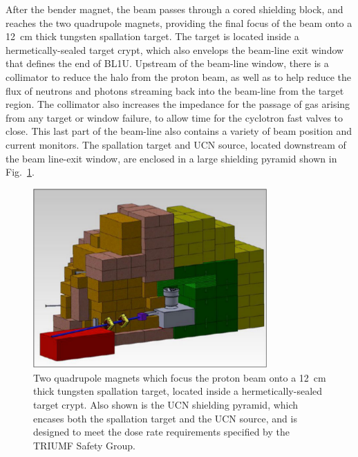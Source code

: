 After the bender magnet, the beam passes through a cored shielding
block, and reaches the two quadrupole magnets, providing the final
focus of the beam onto a 12~cm thick tungsten spallation target.  The
target is located inside a hermetically-sealed target crypt, which
also envelops the beam-line exit window that defines the end of BL1U.
Upstream of the beam-line window, there is a collimator to reduce the
halo from the proton beam, as well as to help reduce the flux of
neutrons and photons streaming back into the beam-line from the target
region. The collimator also increases the impedance for the passage of
gas arising from any target or window failure, to allow time for the
cyclotron fast valves to close. This last part of the beam-line also
contains a variety of beam position and current monitors. The
spallation target and UCN source, located downstream of the beam
line-exit window, are enclosed in a large shielding pyramid shown in
Fig.~\ref{fig:pyramid}.
\begin{figure}[h!]
  \centering
  \includegraphics[width=0.8\textwidth]{pyramid.png}
  \caption[Two quadrupole magnets and the shidling pyramid]{Two
    quadrupole magnets which focus the proton beam onto a 12~cm thick
    tungsten spallation target, located inside a hermetically-sealed
    target crypt. Also shown is the UCN shielding pyramid, which
    encases both the spallation target and the UCN source, and is
    designed to meet the dose rate requirements specified by the
    TRIUMF Safety Group.}
  \label{fig:pyramid}
\end{figure}


